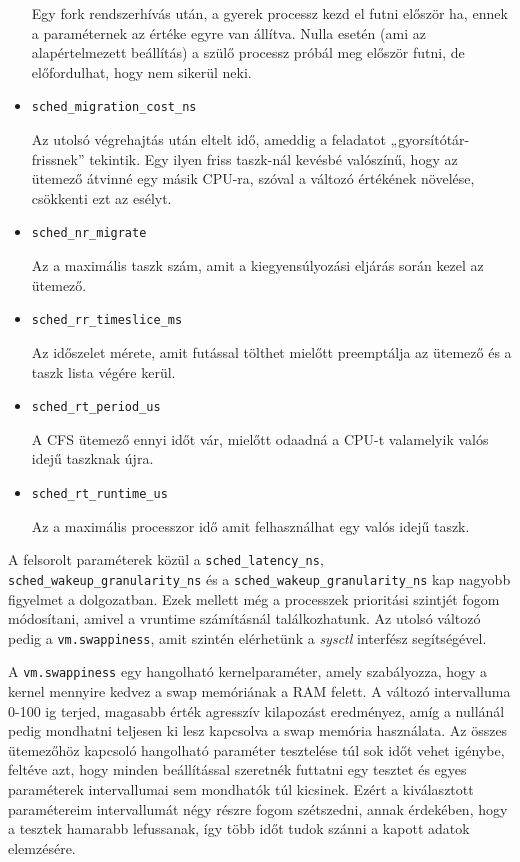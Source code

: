 \begin{itemize}
Egy fork rendszerhívás után, a gyerek processz kezd el futni először ha, ennek a paraméternek az értéke egyre van állítva. Nulla esetén (ami az alapértelmezett beállítás) a szülő processz próbál meg először futni, de előfordulhat, hogy nem sikerül neki.

\item \texttt{sched\_migration\_cost\_ns}

Az utolsó végrehajtás után eltelt idő, ameddig a feladatot „gyorsítótár-frissnek” tekintik.
Egy ilyen friss taszk-nál kevésbé valószínű, hogy az ütemező átvinné egy másik CPU-ra, szóval a változó értékének növelése, csökkenti ezt az esélyt.
\item \texttt{sched\_nr\_migrate}

Az a maximális taszk szám, amit a kiegyensúlyozási eljárás során kezel az ütemező.
\item \texttt{sched\_rr\_timeslice\_ms}

Az időszelet mérete, amit futással tölthet mielőtt preemptálja az ütemező és a taszk lista végére kerül.
\item \texttt{sched\_rt\_period\_us}

A CFS ütemező ennyi időt vár, mielőtt odaadná a CPU-t valamelyik valós idejű taszknak újra.
\item \texttt{sched\_rt\_runtime\_us}

Az a maximális processzor idő amit felhasználhat egy valós idejű taszk.
\end{itemize}
A felsorolt paraméterek közül a \texttt{sched\_latency\_ns}, \texttt{sched\_wakeup\_granularity\_ns} és a \texttt{sched\_wakeup\_granularity\_ns} kap nagyobb figyelmet a dolgozatban. Ezek mellett még a processzek prioritási szintjét fogom módosítani, amivel a vruntime számításnál találkozhatunk.
Az utolsó változó pedig a \texttt{vm.swappiness}, amit szintén elérhetünk a \textit{sysctl} interfész segítségével. 

A \texttt{vm.swappiness} egy hangolható kernelparaméter, amely szabályozza, hogy a kernel mennyire kedvez a swap memóriának a RAM felett. A változó intervalluma 0-100 ig terjed, magasabb érték agresszív kilapozást eredményez, amíg a nullánál pedig mondhatni teljesen ki lesz kapcsolva a swap memória használata. Az összes ütemezőhöz kapcsoló hangolható paraméter tesztelése túl sok időt vehet igénybe, feltéve azt, hogy minden beállítással szeretnék futtatni egy tesztet és egyes paraméterek intervallumai sem mondhatók túl kicsinek. Ezért a kiválasztott paramétereim intervallumát négy részre fogom szétszedni, annak érdekében, hogy a tesztek hamarabb lefussanak, így több időt tudok szánni a kapott adatok elemzésére.

